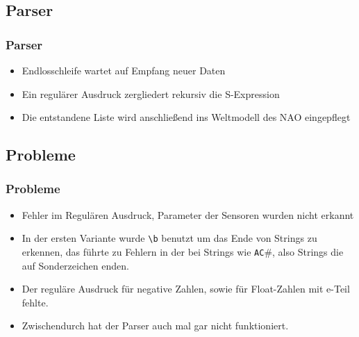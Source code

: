 \subsection{Parser}
\frame
{
  \frametitle{Parser}
  
  \begin{itemize}
    \item Endlosschleife wartet auf Empfang neuer Daten
    \item Ein regul\"arer Ausdruck zergliedert rekursiv die S-Expression\\
    
    \item Die entstandene Liste wird anschlie{\ss}end ins Weltmodell des NAO eingepflegt
  \end{itemize}
}

\subsection{Probleme}
\frame
{
  \frametitle{Probleme}
  
  \begin{itemize}
    \item Fehler im Regul\"aren Ausdruck, Parameter der Sensoren wurden nicht erkannt
    \item In der ersten Variante wurde \texttt{\textbackslash b} benutzt um das Ende von Strings zu erkennen, das führte zu Fehlern in der bei Strings wie \texttt{AC$\#$}, also Strings die auf Sonderzeichen enden.
    \item Der reguläre Ausdruck für negative Zahlen, sowie für Float-Zahlen mit e-Teil fehlte.
    \item Zwischendurch hat der Parser auch mal gar nicht funktioniert.
  \end{itemize}
}
